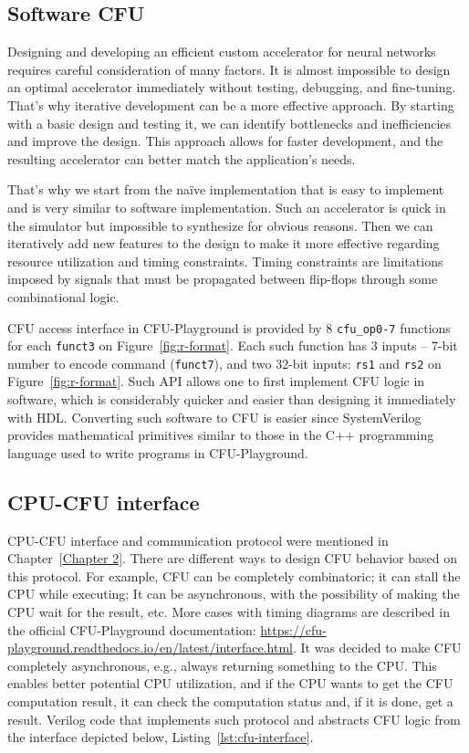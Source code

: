 \subsection{Software CFU}

Designing and developing an efficient custom accelerator for neural networks requires careful consideration of many factors. It is almost impossible to design an optimal accelerator immediately without testing, debugging, and fine-tuning. That's why iterative development can be a more effective approach. By starting with a basic design and testing it, we can identify bottlenecks and inefficiencies and improve the design. This approach allows for faster development, and the resulting accelerator can better match the application's needs.

That's why we start from the na\"{i}ve implementation that is easy to implement and is very similar to software implementation. Such an accelerator is quick in the simulator but impossible to synthesize for obvious reasons. Then we can iteratively add new features to the design to make it more effective regarding resource utilization and timing constraints. Timing constraints are limitations imposed by signals that must be propagated between flip-flops through some combinational logic. 

CFU access interface in CFU-Playground is provided by 8 \verb|cfu_op0-7| functions for each \verb|funct3| on Figure~\ref{fig:r-format}. Each such function has 3 inputs -- 7-bit number to encode command (\verb|funct7|), and two 32-bit inputs: \verb|rs1| and \verb|rs2| on Figure~\ref{fig:r-format}. Such API allows one to first implement CFU logic in software, which is considerably quicker and easier than designing it immediately with HDL. Converting such software to CFU is easier since SystemVerilog provides mathematical primitives similar to those in the C++ programming language used to write programs in CFU-Playground. 

\subsection{CPU-CFU interface}
 
CPU-CFU interface and communication protocol were mentioned in Chapter~\ref{Chapter 2}. There are different ways to design CFU behavior based on this protocol. For example, CFU can be completely combinatoric; it can stall the CPU while executing; It can be asynchronous, with the possibility of making the CPU wait for the result, etc. More cases with timing diagrams are described in the official CFU-Playground documentation: \url{https://cfu-playground.readthedocs.io/en/latest/interface.html}. It was decided to make CFU completely asynchronous, e.g., always returning something to the CPU. This enables better potential CPU utilization, and if the CPU wants to get the CFU computation result, it can check the computation status and, if it is done, get a result. Verilog code that implements such protocol and abstracts CFU logic from the interface depicted below, Listing~\ref{lst:cfu-interface}. 

